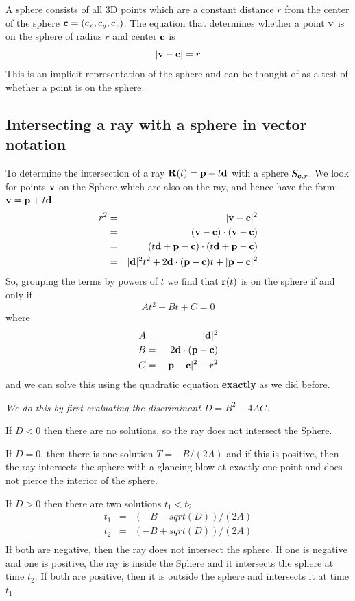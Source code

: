 \documentclass{book}
\newcommand{\vect}[1]{{\bf{ #1}}}
\begin{document}
A sphere consists of all 3D points which are a constant distance $r$
from the center of the sphere ${\vect c} = (c_x,c_y,c_z)$. The equation
that determines whether a point ${\vect v}$ is on the sphere of radius
$r$ and center ${\vect c}$ is
\[
\vert {\vect v} - {\vect c} \vert = r
\]
This is an implicit representation of the sphere and can be thought of as
a test of whether a point is on the sphere.

\subsection{Intersecting a ray with a sphere in vector notation}
To determine the intersection of a ray $\vect R(t) = {\vect p} + t {\vect d}$
with a sphere $S_{{\vect c},r}$. We look for points ${\vect v}$ on the
Sphere which are also on the ray, and hence have the form: $\vect v = {\vect p} + t {\vect d}$
\begin{eqnarray*}
r^2 &=& \vert {\vect v} - {\vect c} \vert^2 \\
 &=& ({\vect v} - {\vect c}) \cdot ({\vect v} - {\vect c}) \\
 &=& (t {\vect d} + {\vect p} - {\vect c}) \cdot (t {\vect d} + {\vect p} - {\vect c}) \\
 &=& \vert {\vect d} \vert^2 t^2 + 2 {\vect d} \cdot({\vect p} - {\vect c}) t + \vert {\vect p} - {\vect c}\vert^2
\end{eqnarray*}
So, grouping the terms by powers of $t$ we find that ${\vect r}(t)$ is on
the sphere if and only if
\[
A t^2 + B t + C = 0
\]
where
\begin{eqnarray*}
A &=& \vert {\vect d} \vert^2  \\
B &=&  2 {\vect d} \cdot({\vect p} - {\vect c})  \\
C &=& \vert {\vect p} - {\vect c}\vert^2 - r^2
\end{eqnarray*}
and we can solve this using the quadratic equation {\bf {exactly}} as we did before.

{\it
We do this by first evaluating the discriminant $D = B^2 - 4 A C$.

If $D < 0$ then there are no solutions, so the ray does not intersect
the Sphere.

If $D = 0$, then there is one solution $T = -B/(2A)$ and if this is
positive, then the ray intersects the sphere with a glancing blow
at exactly one point and does not pierce the interior of the sphere.

If $D > 0$ then there are two solutions $t_1 < t_2$
\begin{eqnarray*}
t_1 &=& (-B - sqrt(D))/(2A)  \\
t_2 &=& (-B + sqrt(D))/(2A)  \\
\end{eqnarray*}
If both are negative, then the ray does not intersect the sphere.
If one is negative and one is positive, the ray is inside the Sphere
and it intersects the sphere at time $t_2$. If both are positive, then
it is outside the sphere and intersects it at time $t_1$.
}
\end{document}
